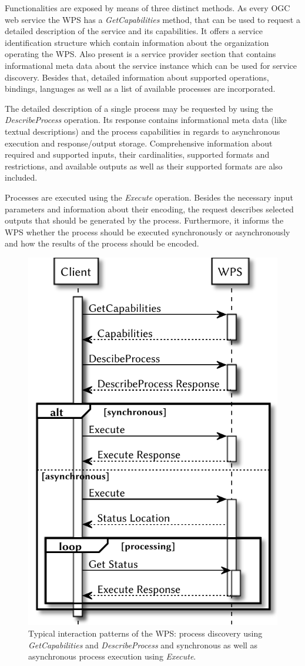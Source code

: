  Functionalities are exposed by means of three distinct methods. As every \ac{OGC} web service the \ac{WPS} has a \emph{GetCapabilities} method, that can be used to request a detailed description of the service and its capabilities. It offers a service identification structure which contain information about the organization operating the \ac{WPS}. Also present is a service provider section that contains informational meta data about the service instance which can be used for service discovery. Besides that, detailed information about supported operations, bindings, languages as well as a list of available processes are incorporated.

  The detailed description of a single process may be requested by using the \emph{DescribeProcess} operation. Its response contains informational meta data (like textual descriptions) and the process capabilities in regards to asynchronous execution and response/output storage. Comprehensive information about required and supported inputs, their cardinalities, supported formats and restrictions, and available outputs as well as their supported formats are also included.

  Processes are executed using the \emph{Execute} operation. Besides the necessary input parameters and information about their encoding, the request describes selected outputs that should be generated by the process. Furthermore, it informs the \ac{WPS} whether the process should be executed synchronously or asynchronously and how the results of the process should be encoded.

  \begin{figure}[!htb]
    \centering
    \includegraphics[width = 0.40140845070422537\linewidth]{figures/sequence-diagram-wps.pdf}
    \caption{\label{fig:sd:wps}Typical interaction patterns of the \acl{WPS}: process discovery using \emph{GetCapabilities} and \emph{DescribeProcess} and synchronous as well as asynchronous process execution using \emph{Execute}.}
  \end{figure}

